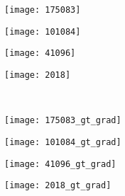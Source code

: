 \begin{figure}[!ht] 
   
    \begin{subfigure}[t]{\textwidth+20pt\relax}
    	\centering
    	\texttt{[image: 175083]} 
    \end{subfigure}      
    \begin{subfigure}[b]{0.23\textwidth}
    	\centering
        \texttt{[image: 101084]}
    \end{subfigure}
    \begin{subfigure}[b]{0.23\textwidth}
    	\centering
        \texttt{[image: 41096]}
    \end{subfigure}
    \begin{subfigure}[b]{0.23\textwidth}
    	\centering
        \texttt{[image: 2018]}
    \end{subfigure} \\ \vspace{-5pt}      
    
    \begin{subfigure}[t]{\textwidth+20pt\relax}
    	\centering
    	\texttt{[image: 175083\_gt\_grad]} 
    \end{subfigure}      
    \begin{subfigure}[b]{0.23\textwidth}
    	\centering
        \texttt{[image: 101084\_gt\_grad]}
    \end{subfigure}
    \begin{subfigure}[b]{0.23\textwidth}
    	\centering
        \texttt{[image: 41096\_gt\_grad]}
    \end{subfigure}
    \begin{subfigure}[b]{0.23\textwidth}
    	\centering
        \texttt{[image: 2018\_gt\_grad]}
    \end{subfigure} \\ \vspace{-5pt}   
    

\end{figure}
